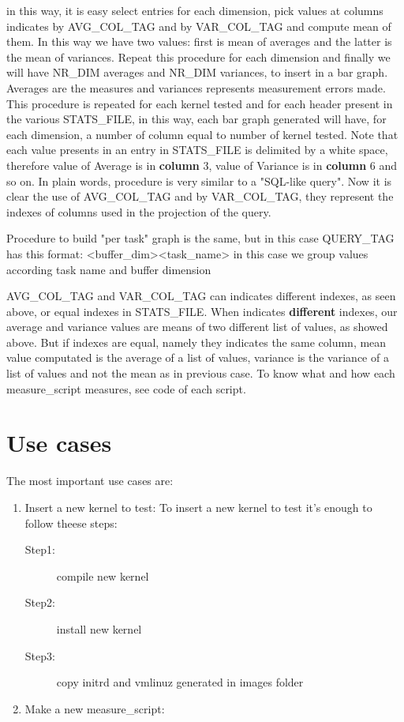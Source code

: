 \documentclass[a4paper,10pt]{article}
\begin{document}
\begin{multicols}{2}
in this way, it is easy select entries for each dimension, pick values at columns indicates by AVG\_COL\_TAG and by VAR\_COL\_TAG
and compute mean of them. In this way we have two values: first is mean
of averages and the latter is the mean of variances. Repeat this procedure for each dimension and finally we
will have NR\_DIM averages and NR\_DIM variances, to insert in a bar graph. Averages are the measures and variances represents measurement 
errors made. This procedure is repeated for each kernel tested and for each header present in the various STATS\_FILE, 
in this way, each bar graph generated will have, for each dimension, a number of column equal 
to number of kernel tested. Note that each value presents in an entry in STATS\_FILE is delimited by a white space, therefore value of 
Average is in \textbf{column} 3, value of Variance is in \textbf{column} 6 and so on.
In plain words, procedure is very similar to a "SQL-like query".
Now it is clear the use of AVG\_COL\_TAG and by VAR\_COL\_TAG, they represent the indexes of columns used
in the projection of the query. 

Procedure to build "per task" graph is the same, but in this case QUERY\_TAG has this format: 
<buffer\_dim><task\_name> in this case we group values according task name and buffer dimension

AVG\_COL\_TAG and VAR\_COL\_TAG can indicates different indexes, as seen above, or equal indexes in STATS\_FILE. When indicates 
\textbf{different} indexes, our average and variance values are means of two different list of values, as showed above. But if indexes 
are equal, namely they indicates the same column, mean value computated is the average of a list of values, variance is the variance of 
a list of values and not the mean as in previous case. To know what and how each measure_script measures, see code of each script.


\section{Use cases}

The most important use cases are:
\begin{enumerate}
	\item Insert a new kernel to test:
	To insert a new kernel to test it's enough to follow theese steps:
	\begin{description}
		\item[Step1:] compile new kernel
		\item[Step2:] install new kernel
		\item[Step3:] copy initrd and vmlinuz generated in images folder
	\end{description} 
	\item Make a new measure\_script:


\end{enumerate}
\end{multicols}
\end{document}
